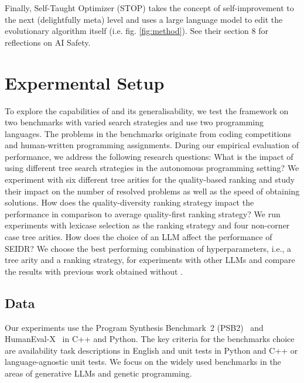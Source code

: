 Finally, Self-Taught Optimizer (STOP) \cite{zelikmanSelfTaughtOptimizerSTOP2023} takes the concept of self-improvement to the next (delightfully meta) level and uses a large language model to edit the evolutionary algorithm itself (i.e. fig. \ref{fig:method}). See their section 8 for reflections on AI Safety.

\section{Expermental Setup}
\label{sec:eval}

To explore the capabilities of \method{} and its generalisability, we test the framework on two benchmarks  with varied search strategies and use two programming languages. 
The problems in the benchmarks originate from coding competitions and human-written programming assignments. 
During our empirical evaluation of \method{} performance, we address the following research questions:
What is the impact of using different tree search strategies
in the autonomous programming setting? 
We experiment with six different tree arities for the quality-based ranking and study their impact on the number of resolved problems as well as the speed of obtaining solutions.
How does the quality-diversity ranking strategy impact the performance in comparison to average quality-first ranking strategy? 
We run experiments with lexicase selection as the ranking strategy and four non-corner case tree arities.
How does the choice of an LLM affect the performance of SEIDR? 
We choose the best performing combination of hyperparameters, i.e., a tree arity and a ranking strategy, for experiments with other LLMs and compare the results with previous work obtained without \method{}. 


\subsection{Data}
\label{sec:data}

Our experiments use the Program Synthesis Benchmark~2 (PSB2)~\cite{helmuth2022:applying} and HumanEval-X~\cite{zheng2023:codegeex} in C++ and Python. 
The key criteria for the benchmarks choice are availability task descriptions in English and unit tests in Python and C++ or language-agnostic unit tests. 
We focus on the widely used benchmarks in the areas of generative LLMs and genetic programming. 

